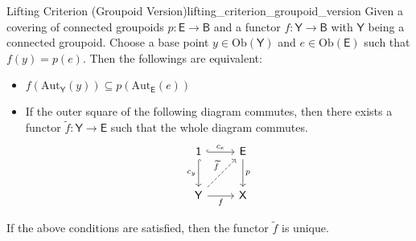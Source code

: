 \documentclass{report}
\begin{document}
\begin{proposition}{Lifting Criterion (Groupoid Version)}{lifting_criterion_groupoid_version}
	Given a covering of connected groupoids $p:\mathsf{E} \rightarrow\mathsf{B} $ and a functor $f:\mathsf{Y} \rightarrow\mathsf{B}$ with $\mathsf{Y}$ being a connected groupoid. Choose a base point $y\in \mathrm{Ob}(\mathsf{Y})$ and $e\in \mathrm{Ob}(\mathsf{E})$ such that $f(y)=p(e)$.
	Then the followings are equivalent:
	\begin{itemize}
		\item $f\left(\mathrm{Aut}_\mathsf{Y}(y)\right)\subseteq p\left(\mathrm{Aut}_\mathsf{E}(e)\right)$
		\item If the outer square of the following diagram commutes, then there exists a functor $\widetilde{f}:\mathsf{Y}\to \mathsf{E}$ such that the whole diagram commutes.
	\[
	\begin{tikzcd}[ampersand replacement=\&]
		\mathsf{1} \arrow[r, "c_e", hook] \arrow[d, "c_y"', hook]                      \& \mathsf{E} \arrow[d, "p"] \\ [+7pt]
		\mathsf{Y} \arrow[r, "f"'] \arrow[ru, "\widetilde{f}", dashed] \&\mathsf{X}              
	\end{tikzcd}
	\]
	\end{itemize}
	If the above conditions are satisfied, then the functor $\widetilde{f}$ is unique.
\end{proposition}
\end{document}
